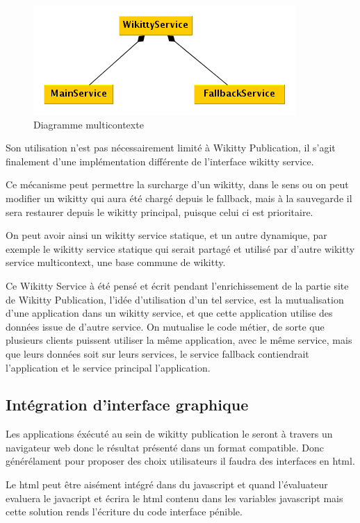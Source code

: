 \begin{figure}[!ht]
\centering
\includegraphics{image/multicontext.png}
  		\caption{Diagramme multicontexte}
  		\label{diagmulticontext}
\end{figure}


Son utilisation n'est pas nécessairement limité à Wikitty Publication, il s'agit
finalement d'une implémentation différente de l'interface wikitty service. 

Ce mécanisme peut permettre la surcharge d'un wikitty, dans le sens ou on peut
modifier un wikitty qui aura été chargé depuis le fallback, mais à la sauvegarde
il sera restaurer depuis le wikitty principal, puisque celui ci est prioritaire.

On peut avoir ainsi un wikitty service statique, et un autre dynamique, par
exemple le wikitty service statique qui serait partagé et utilisé par d'autre
wikitty service multicontext, une base commune de wikitty. 

Ce Wikitty Service à été pensé et écrit pendant l'enrichissement de la partie 
site de Wikitty Publication, l'idée d'utilisation d'un tel service, est la 
mutualisation d'une application dans un wikitty service, et que cette 
application utilise des données issue de d'autre service. On mutualise le code 
métier, de sorte que plusieurs clients puissent utiliser la même application, 
avec le même service, mais que leurs données soit sur leurs services, 
le service fallback contiendrait l'application et le service principal 
l'application.

\subsection{Intégration d'interface graphique}

Les applications éxécuté au sein de wikitty publication le seront à travers 
un navigateur web donc le résultat présenté dans un format compatible.
Donc générélament pour proposer des choix utilisateurs il faudra des interfaces
en html.

Le html peut être aisément intégré dans du javascript et quand l'évaluateur
evaluera le javacript et écrira le html contenu dans les variables javascript
mais cette solution rends l'écriture du code interface pénible.

